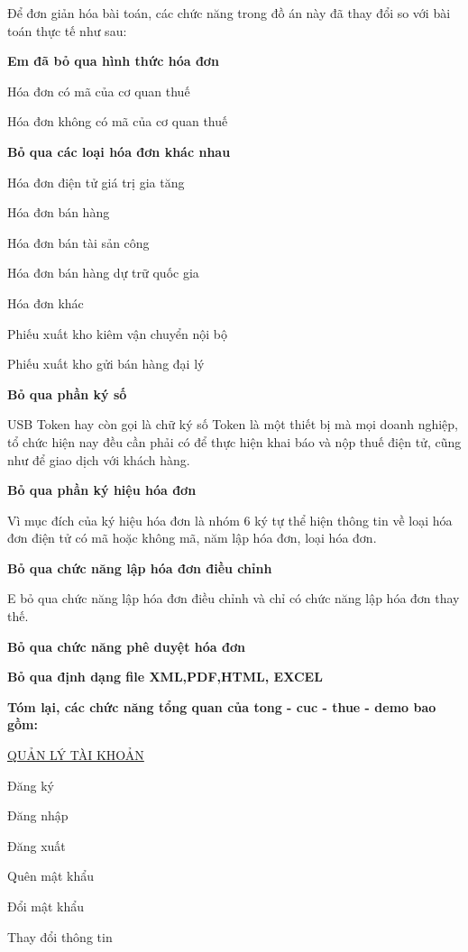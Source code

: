 
Để đơn giản hóa bài toán, các chức năng trong đồ án này đã thay đổi so với bài toán thực tế như sau:

\textbf{Em đã bỏ qua hình thức hóa đơn}

Hóa đơn có mã của cơ quan thuế

Hóa đơn không có mã của cơ quan thuế

\textbf{Bỏ qua các loại hóa đơn khác nhau}

Hóa đơn điện tử giá trị gia tăng

Hóa đơn bán hàng

Hóa đơn bán tài sản công

Hóa đơn bán hàng dự trữ quốc gia

Hóa đơn khác

Phiếu xuất kho kiêm vận chuyển nội bộ

Phiếu xuất kho gửi bán hàng đại lý


\textbf{Bỏ qua phần ký số}

USB Token hay còn gọi là chữ ký số Token là một thiết bị mà mọi doanh nghiệp, tổ chức hiện nay đều cần phải có để thực hiện khai báo và nộp thuế điện tử, cũng như để giao dịch với khách hàng.

\textbf{Bỏ qua phần ký hiệu hóa đơn}

Vì mục đích của ký hiệu hóa đơn là nhóm 6 ký tự thể hiện thông tin về loại hóa đơn điện tử có mã hoặc không mã, năm lập hóa đơn, loại hóa đơn.

\textbf{Bỏ qua chức năng lập hóa đơn điều chỉnh}

E bỏ qua chức năng lập hóa đơn điều chỉnh và chỉ có chức năng lập hóa đơn thay thế.

\textbf{Bỏ qua chức năng phê duyệt hóa đơn}

\textbf{Bỏ qua định dạng file XML,PDF,HTML, EXCEL}

\textbf{Tóm lại, các chức năng tổng quan của tong - cuc - thue - demo bao gồm:}

\underline{\textsc{QUẢN LÝ TÀI KHOẢN}}

Đăng ký



Đăng nhập

Đăng xuất

Quên mật khẩu



Đổi mật khẩu

Thay đổi thông tin

